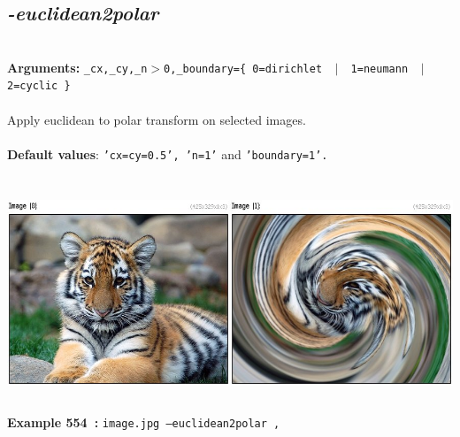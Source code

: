 \documentclass[a4paper,11pt,twoside]{book}
\begin{document}
\subsection{\emph{-euclidean2polar} }\vspace*{-0.5em}
~\\\textbf{Arguments: } 
{\small \texttt{\_cx,\_cy,\_n$>$0,\_boundary=\{ 0=dirichlet ~$|$~ 1=neumann ~$|$~ 2=cyclic \}}}\\~\\
Apply euclidean to polar transform on selected images.
~\\~\\\textbf{Default values}: {\small \texttt{'cx=cy=0.5', 'n=1'} and \texttt{'boundary=1'.}}
\begin{center}\includegraphics[keepaspectratio=true,height=7cm,width=\textwidth]{img/gmic_def554.jpg}\\
{\footnotesize \textbf{Example 554~:} \texttt{image.jpg --euclidean2polar ,}}
\end{center}
\end{document}
